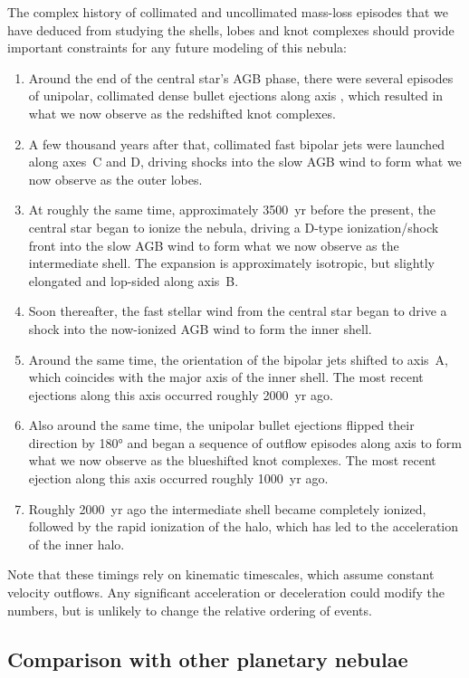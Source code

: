 \documentclass[useAMS, usenatbib]{mnras}
\begin{document}
The complex history of collimated and uncollimated mass-loss episodes
that we have deduced from studying the shells, lobes and knot complexes
should provide important constraints for any future modeling of this nebula:
\begin{enumerate}[1.]
\item Around the end of the central star's AGB phase,
  there were several episodes of unipolar, collimated dense bullet ejections
  along axis ,
  which resulted in what we now observe as the redshifted knot complexes. 
\item A few thousand years after that,
  collimated fast bipolar jets were launched along axes~C and D,
  driving shocks into the slow AGB wind to form what we now observe as the outer lobes.
\item At roughly the same time, approximately \SI{3500}{yr} before the present,
  the central star began to ionize the nebula,
  driving a D-type ionization/shock front into the slow AGB wind
  to form what we now observe as the intermediate shell.
  The expansion is approximately isotropic,
  but slightly elongated and lop-sided along axis~B. 
\item Soon thereafter,
  the fast stellar wind from the central star
  began to drive a shock into the now-ionized AGB wind
  to form the inner shell.
\item Around the same time, the orientation of the bipolar jets shifted to axis~A,
  which coincides with the major axis of the inner shell.
  The most recent ejections along this axis occurred roughly \SI{2000}{yr} ago.
\item Also around the same time,
  the unipolar bullet ejections flipped their direction by \ang{180}
  and began a sequence of outflow episodes along axis 
  to form what we now observe as the blueshifted knot complexes.
  The most recent ejection along this axis occurred roughly \SI{1000}{yr} ago.
\item Roughly \SI{2000}{yr} ago the intermediate shell became completely ionized,
  followed by the rapid ionization of the halo,
  which has led to the acceleration of the inner halo.
\end{enumerate}
Note that these timings rely on kinematic timescales,
which assume constant velocity outflows.
Any significant acceleration or deceleration could modify the numbers,
but is unlikely to change the relative ordering of events.

\subsection{Comparison with other planetary nebulae}
\label{sec:comp-with-other}
\end{document}
